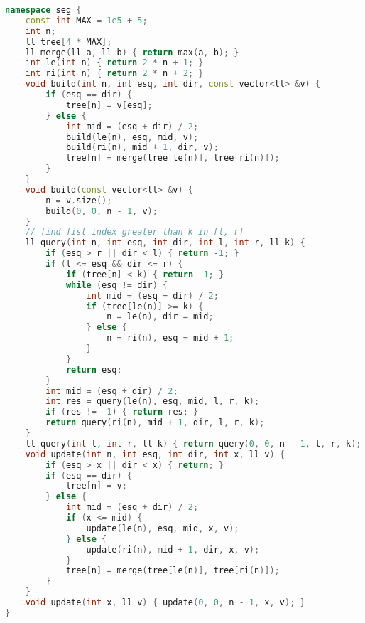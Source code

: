 \documentclass[11pt, a4paper, twoside]{book}
\begin{document}
\begin{lstlisting}[language=C++]
namespace seg {
    const int MAX = 1e5 + 5;
    int n;
    ll tree[4 * MAX];
    ll merge(ll a, ll b) { return max(a, b); }
    int le(int n) { return 2 * n + 1; }
    int ri(int n) { return 2 * n + 2; }
    void build(int n, int esq, int dir, const vector<ll> &v) {
        if (esq == dir) {
            tree[n] = v[esq];
        } else {
            int mid = (esq + dir) / 2;
            build(le(n), esq, mid, v);
            build(ri(n), mid + 1, dir, v);
            tree[n] = merge(tree[le(n)], tree[ri(n)]);
        }
    }
    void build(const vector<ll> &v) {
        n = v.size();
        build(0, 0, n - 1, v);
    }
    // find fist index greater than k in [l, r]
    ll query(int n, int esq, int dir, int l, int r, ll k) {
        if (esq > r || dir < l) { return -1; }
        if (l <= esq && dir <= r) {
            if (tree[n] < k) { return -1; }
            while (esq != dir) {
                int mid = (esq + dir) / 2;
                if (tree[le(n)] >= k) {
                    n = le(n), dir = mid;
                } else {
                    n = ri(n), esq = mid + 1;
                }
            }
            return esq;
        }
        int mid = (esq + dir) / 2;
        int res = query(le(n), esq, mid, l, r, k);
        if (res != -1) { return res; }
        return query(ri(n), mid + 1, dir, l, r, k);
    }
    ll query(int l, int r, ll k) { return query(0, 0, n - 1, l, r, k); }
    void update(int n, int esq, int dir, int x, ll v) {
        if (esq > x || dir < x) { return; }
        if (esq == dir) {
            tree[n] = v;
        } else {
            int mid = (esq + dir) / 2;
            if (x <= mid) {
                update(le(n), esq, mid, x, v);
            } else {
                update(ri(n), mid + 1, dir, x, v);
            }
            tree[n] = merge(tree[le(n)], tree[ri(n)]);
        }
    }
    void update(int x, ll v) { update(0, 0, n - 1, x, v); }
}
\end{lstlisting}

\hfill
\end{document}

